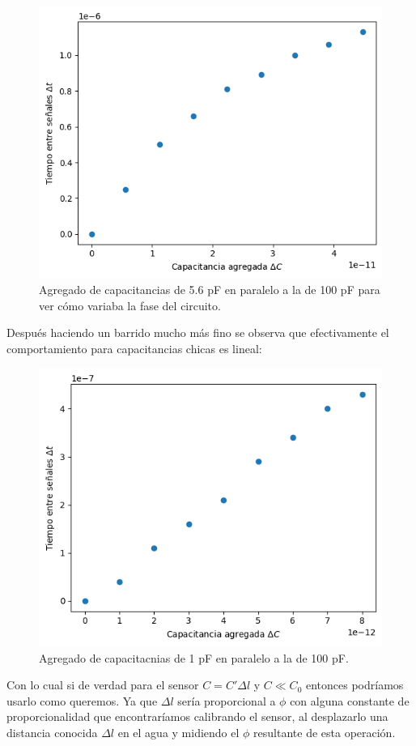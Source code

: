 \begin{figure}[!ht]
	\centering
	\includegraphics[width=0.6157\linewidth]{Figures/28_04_2025/Barrido_grande}
	\caption{Agregado de capacitancias de 5.6 pF en paralelo a la de 100 pF para ver cómo variaba la fase del circuito.}
	\label{fig:barridogrande}
\end{figure}

Después haciendo un barrido mucho más fino se observa que efectivamente el comportamiento para capacitancias chicas es lineal: %

\begin{figure}[!ht]
	\centering
	\includegraphics[width=0.6157\linewidth]{Figures/28_04_2025/Barrido_chico}
	\caption{Agregado de capacitacnias de 1 pF en paralelo a la de 100 pF.}
	\label{fig:barridochico}
\end{figure}

Con lo cual si de verdad para el sensor $C=C'\Delta l $ y $C\ll C_0$ entonces podríamos usarlo como queremos. Ya que $\Delta l$ sería proporcional a $\phi$ con alguna constante de proporcionalidad que encontraríamos calibrando el sensor, al desplazarlo una distancia conocida $\Delta l$ en el agua y midiendo el $\phi$ resultante de esta operación. 

